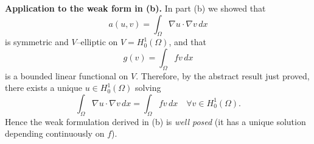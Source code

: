 \textbf{Application to the weak form in (b).}
In part (b) we showed that
\[
  a(u,v) = \int_\Omega \nabla u\cdot\nabla v\,dx
\]
is symmetric and $V$--elliptic on $V=H^1_0(\Omega)$, and that
\[
  g(v) = \int_\Omega f v\,dx
\]
is a bounded linear functional on $V$. Therefore, by the abstract result just proved,
there exists a unique $u\in H^1_0(\Omega)$ solving
\[
  \int_\Omega \nabla u\cdot\nabla v\,dx
  = \int_\Omega f v\,dx
  \quad\forall v\in H^1_0(\Omega).
\]
Hence the weak formulation derived in (b) is \emph{well posed} (it has a unique solution
depending continuously on $f$).
